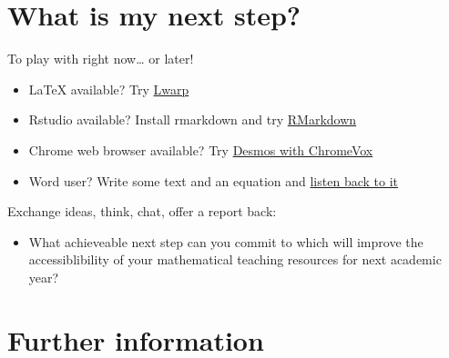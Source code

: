 \documentclass[
  10pt,
  a4paper]{article}
\providecommand{\tightlist}{%
  \setlength{\itemsep}{0pt}\setlength{\parskip}{0pt}}
\theoremstyle{plain}
\theoremstyle{plain}
\theoremstyle{plain}
\theoremstyle{plain}
\theoremstyle{plain}
\theoremstyle{definition}
\theoremstyle{definition}
\theoremstyle{definition}
\theoremstyle{remark}
\begin{document}
\hypertarget{what-is-my-next-step}{%
\section{What is my next step?}\label{what-is-my-next-step}}

To play with right now\ldots{} or later!

\begin{itemize}
\tightlist
\item
  LaTeX available? Try \href{https://github.com/STEM-Enable/Getting-started-with-accessible-maths-March-2023/raw/main/example/LwarpExample.zip}{Lwarp}
\item
  Rstudio available? Install rmarkdown and try \href{https://stem-enable.github.io/RMarkdownWorkshop/}{RMarkdown}
\item
  Chrome web browser available? Try \href{https://people.bath.ac.uk/cspehj/coventry/arclengthInR.html}{Desmos with ChromeVox}
\item
  Word user? Write some text and an equation and \href{https://stem-enable.github.io/WordWorkshop/immersive.html}{listen back to it}
\end{itemize}

Exchange ideas, think, chat, offer a report back:

\begin{itemize}
\tightlist
\item
  What achieveable next step can you commit to which will improve the accessiblibility of your mathematical teaching resources for next academic year?
\end{itemize}

\hypertarget{further-information}{%
\section{Further information}\label{further-information}}
\end{document}
